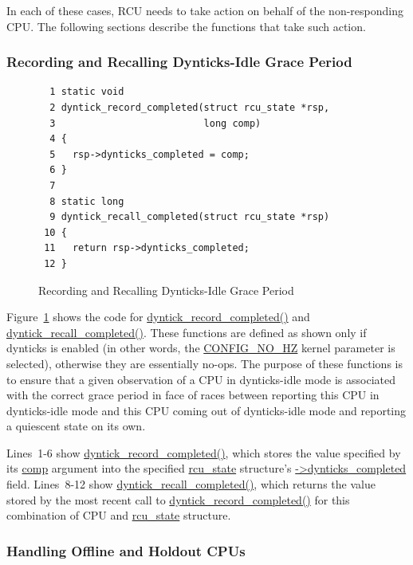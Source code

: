 In each of these cases, RCU needs to take action on behalf of the
non-responding CPU.
The following sections describe the functions that take such action.

\subsubsection{Recording and Recalling Dynticks-Idle Grace Period}
\label{app:rcuimpl:rcutreewt:Recording and Recalling Dynticks-Idle Grace Period}

\begin{figure}[tbp]
{ \scriptsize
\begin{verbatim}
  1 static void
  2 dyntick_record_completed(struct rcu_state *rsp,
  3                          long comp)
  4 {
  5   rsp->dynticks_completed = comp;
  6 }
  7 
  8 static long
  9 dyntick_recall_completed(struct rcu_state *rsp)
 10 {
 11   return rsp->dynticks_completed;
 12 }
\end{verbatim}
}
\caption{Recording and Recalling Dynticks-Idle Grace Period}
\label{fig:app:rcuimpl:rcutreewt:Recording and Recalling Dynticks-Idle Grace Period}
\end{figure}

Figure~\ref{fig:app:rcuimpl:rcutreewt:Recording and Recalling Dynticks-Idle Grace Period}
shows the code for \url{dyntick_record_completed()} and
\url{dyntick_recall_completed()}.
These functions are defined as shown only if dynticks
is enabled (in other words, the \url{CONFIG_NO_HZ} kernel parameter
is selected), otherwise they are essentially no-ops.
The purpose of these functions is to ensure that a given observation
of a CPU in dynticks-idle mode is associated with the correct
grace period in face of races between reporting this CPU in
dynticks-idle mode and this CPU coming out of dynticks-idle mode
and reporting a quiescent state on its own.

Lines~1-6 show \url{dyntick_record_completed()}, which stores the
value specified by its \url{comp} argument into the specified
\url{rcu_state} structure's \url{->dynticks_completed} field.
Lines~8-12 show \url{dyntick_recall_completed()}, which returns
the value stored by the most recent call to
\url{dyntick_record_completed()} for this combination of CPU and
\url{rcu_state} structure.

\subsubsection{Handling Offline and Holdout CPUs}
\label{app:rcuimpl:rcutreewt:Handling Offline and Holdout CPUs}

